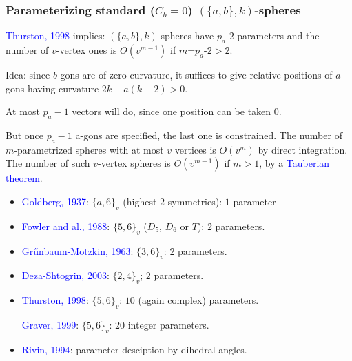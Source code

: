 \documentclass{beamer}
\begin{document}
\begin{frame}\frametitle{Parameterizing standard ($C_b=0$) 
$(\{a,b\},k)$-spheres}
\vspace{-3mm}

\textcolor{blue}{Thurston, 1998} implies: $(\{a,b\},k)$-spheres
 have $p_{a}$-$2$ parameters and the number of $v$-vertex ones is
$O(v^{m-1})$ if $m$=$p_a$-$2>2$.

Idea: since $b$-gons are of zero curvature, 
it suffices to give relative
positions of $a$-gons having curvature $2k-a(k-2)>0$.

At most $p_a-1$ vectors will do, since one position can be 
taken 
$0$.

But once $p_a-1$ a-gons are specified, the 
last one is constrained.
The number of $m$-parametrized spheres with at most $v$ vertices is $O(v^m)$ by direct 
integration.
The number of such $v$-vertex spheres is $O(v^{m-1})$ if $m>1$, by 
a \textcolor{blue}{ Tauberian theorem}.
\pause

\begin{itemize}
\item \textcolor{blue}{Goldberg, 1937}:  $\{a,6\}_v$ (highest $2$ symmetries): $1$ 
parameter
\item \textcolor{blue}{Fowler and al., 1988}: $\{5,6\}_v$ ($D_5$, $D_6$ or $T$): $2$ 
parameters. 


\item \textcolor{blue}{Gr\H{u}nbaum-Motzkin, 1963}: $\{3,6\}_v$: $2$ parameters.
\item   \textcolor{blue}{Deza-Shtogrin, 2003}:
$\{2,4\}_v$; $2$ 
parameters.
\item \textcolor{blue}{Thurston, 1998}:  $\{5,6\}_v$: $10$
(again complex) parameters. 

\textcolor{blue}{Graver, 1999}: $\{5,6\}_v$: $20$
integer parameters.

\item \textcolor{blue}{Rivin, 1994}: 
parameter desciption by dihedral angles.
\end{itemize}

\end{frame}
\end{document}
